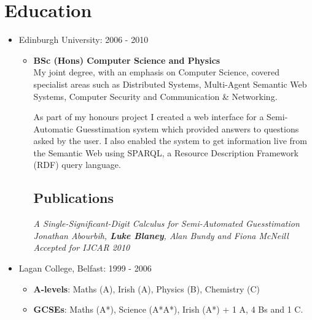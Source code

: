 \documentclass[a4paper]{article}
\begin{document}
\section*{Education}
\begin{itemize}

\item Edinburgh University: 2006 - 2010 \begin{itemize}\item {\bf BSc (Hons) Computer Science and Physics}\\
My joint degree, with an emphasis on Computer Science, covered specialist areas such as Distributed Systems, Multi-Agent Semantic Web Systems, Computer Security and Communication \& Networking.

As part of my honours project I created a web interface for a Semi-Automatic Guesstimation system which provided answers to questions asked by the user.   I also enabled the system to get information live from the Semantic Web using SPARQL, a Resource Description Framework (RDF) query language.
\subsection*{Publications}
\em A Single-Significant-Digit Calculus for Semi-Automated Guesstimation \em\\
Jonathan Abourbih, {\bf Luke Blaney}, Alan Bundy and Fiona McNeill\\
Accepted for IJCAR 2010
\end{itemize}

\item Lagan College, Belfast: 1999 - 2006
\begin{itemize}\item {\bf A-levels}: Maths (A), Irish (A), Physics (B), Chemistry (C)
\item {\bf GCSEs}: Maths (A*), Science (A*A*), Irish (A*) + 1 A, 4 Bs and 1 C.
\end{itemize}

\end{itemize}
\end{document}
